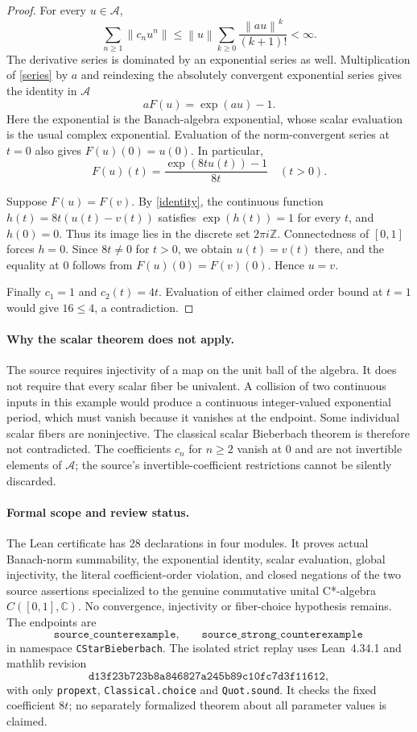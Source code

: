 \documentclass[11pt]{article}
\newcommand{\C}{\mathbb C}
\newcommand{\A}{\mathcal A}
\newcommand{\norm}[1]{\left\lVert#1\right\rVert}
\begin{document}
\begin{proof}
For every $u\in\A$,
\[
 \sum_{n\geq1}\norm{c_nu^n}
 \leq\norm u\sum_{k\geq0}\frac{\norm{au}^k}{(k+1)!}<\infty.
\]
The derivative series is dominated by an exponential series as well.
Multiplication of \eqref{series} by $a$ and reindexing the absolutely
convergent exponential series gives the identity in $\A$
\begin{equation}\label{identity}
 aF(u)=\exp(au)-1.
\end{equation}
Here the exponential is the Banach-algebra exponential, whose scalar
evaluation is the usual complex exponential. Evaluation of the norm-convergent
series at $t=0$ also gives $F(u)(0)=u(0)$. In particular,
\[
 F(u)(t)=\frac{\exp(8tu(t))-1}{8t}\quad(t>0).
\]

Suppose $F(u)=F(v)$. By \eqref{identity}, the continuous function
$h(t)=8t(u(t)-v(t))$ satisfies $\exp(h(t))=1$ for every $t$, and $h(0)=0$.
Thus its image lies in the discrete set $2\pi i\mathbb Z$.
Connectedness of $[0,1]$ forces $h=0$. Since $8t\ne0$ for $t>0$, we obtain
$u(t)=v(t)$ there, and the equality at $0$ follows from $F(u)(0)=F(v)(0)$.
Hence $u=v$.

Finally $c_1=1$ and $c_2(t)=4t$. Evaluation of either claimed order bound
at $t=1$ would give $16\leq4$, a contradiction.
\end{proof}

\paragraph{Why the scalar theorem does not apply.}
The source requires injectivity of a map on the unit ball of the algebra.
It does not require that every scalar fiber be univalent. A collision of two
continuous inputs in this example would produce a continuous integer-valued
exponential period, which must vanish because it vanishes at the endpoint.
Some individual scalar fibers are noninjective. The classical scalar
Bieberbach theorem is therefore not contradicted. The coefficients $c_n$
for $n\geq2$ vanish at $0$ and are not invertible elements of $\A$; the
source's invertible-coefficient restrictions cannot be silently discarded.

\paragraph{Formal scope and review status.}
The Lean certificate has 28 declarations in four modules. It proves actual
Banach-norm summability, the exponential identity, scalar evaluation, global
injectivity, the literal coefficient-order violation, and closed negations
of the two source assertions specialized to the genuine commutative unital
C*-algebra $C([0,1],\C)$. No convergence, injectivity or fiber-choice
hypothesis remains. The endpoints are
\[
\texttt{source\_counterexample},\qquad
\texttt{source\_strong\_counterexample}
\]
in namespace \texttt{CStarBieberbach}. The isolated strict replay uses
Lean~4.34.1 and mathlib revision
\[\texttt{d13f23b723b8a846827a245b89c10fc7d3f11612},\]
with only \texttt{propext}, \texttt{Classical.choice} and \texttt{Quot.sound}.
It checks the fixed coefficient $8t$; no separately formalized theorem about
all parameter values is claimed.
\end{document}
